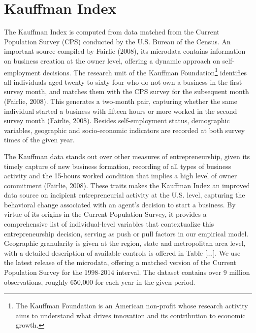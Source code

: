 \section{Kauffman Index}
The Kauffman Index is computed from data matched from the Current Population Survey (CPS) conducted by the U.S. Bureau of the Census. An important source compiled by Fairlie (2008), its microdata contains information on business creation at the owner level, offering a dynamic approach on self-employment decisions. The research unit of the Kauffman Foundation\footnote{The Kauffman Foundation is an American non-profit whose research activity aims to understand what drives innovation and its contribution to economic growth. } identifies all individuals aged twenty to sixty-four who do not own a business in the first survey month, and matches them with the CPS survey for the subsequent month (Fairlie, 2008). This generates a two-month pair, capturing whether the same individual started a business with fifteen hours or more worked in the second survey month (Fairlie, 2008). Besides self-employment status, demographic variables, geographic and socio-economic indicators are recorded at both survey times of the given year. 

The Kauffman data stands out over other measures of entrepreneurship, given its timely capture of new business formation, recording of all types of business activity and the 15-hours worked condition that implies a high level of owner commitment (Fairlie, 2008). These traits makes the Kauffman Index an improved data source on incipient entrepreneurial activity at the U.S. level, capturing the behavioral change associated with an agent’s decision to start a business. By virtue of its origins in the Current Population Survey, it provides a comprehensive list of individual-level variables that contextualize this entrepreneurship decision, serving as push or pull factors in our empirical model. Geographic granularity is given at the region, state and metropolitan area level, with a detailed description of available controls is offered in Table [...]. We use the latest release of the microdata, offering a matched version of the Current Population Survey for the 1998-2014 interval. The dataset contains over 9 million observations, roughly 650,000 for each year in the given period.

